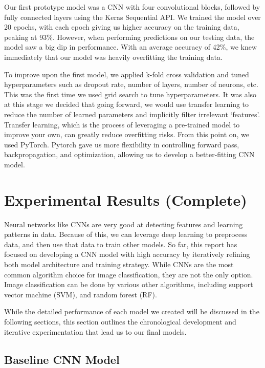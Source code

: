 \documentclass[conference]{IEEEtran}
\begin{document}
Our first prototype model was a CNN with four convolutional blocks, followed by fully connected layers using the Keras Sequential API. We trained the model over 20 epochs, with each epoch giving us higher accuracy on the training data, peaking at 93\%. However, when performing predictions on our testing data, the model saw a big dip in performance. With an average accuracy of 42\%, we knew immediately that our model was heavily overfitting the training data.

To improve upon the first model, we applied k-fold cross validation and tuned hyperparameters such as dropout rate, number of layers, number of neurons, etc. This was the first time we used grid search to tune hyperparameters. It was also at this stage we decided that going forward, we would use transfer learning to reduce the number of learned parameters and implicitly filter irrelevant `features'. Transfer learning, which is the process of leveraging a pre-trained model to improve your own, can greatly reduce overfitting risks. From this point on, we used PyTorch. Pytorch gave us more flexibility in controlling forward pass, backpropagation, and optimization, allowing us to develop a better-fitting CNN model.

\section{\large Experimental Results (Complete)}

Neural networks like CNNs are very good at detecting features and learning patterns in data. Because of this, we can leverage deep learning to preprocess data, and then use that data to train other models. So far, this report has focused on developing a CNN model with high accuracy by iteratively refining both model architecture and training strategy. While CNNs are the most common algorithm choice for image classification, they are not the only option. Image classification can be done by various other algorithms, including support vector machine (SVM), and random forest (RF). 

While the detailed performance of each model we created will be discussed in the following sections, this section outlines the chronological development and iterative experimentation that lead us to our final models.

\subsection{\large Baseline CNN Model}
\end{document}
